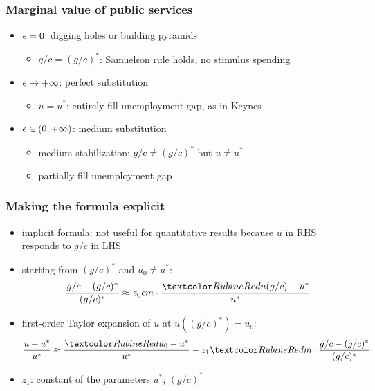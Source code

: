 \documentclass[12pt,xcolor={dvipsnames},hyperref={pdftex,pdfpagemode=UseNone,hidelinks,pdfdisplaydoctitle=true},usepdftitle=false]{beamer}
\begin{document}
\begin{frame}
\frametitle{Marginal value of public services}
\begin{itemize}
\item $\epsilon=0$: digging holes or building pyramids
\begin{itemize}
\item $g/c=(g/c)^{*}$: Samuelson rule holds, no stimulus spending
\end{itemize}
\item $\epsilon\to +\infty$: perfect substitution
\begin{itemize}
\item $u=u^{*}$: entirely fill unemployment gap, as in Keynes
\end{itemize}
\item $\epsilon\in (0,+\infty)$: medium substitution
\begin{itemize}
\item medium stabilization: $g/c\neq (g/c)^{*}$ but $u\neq u^{*}$
\item[\then] partially fill unemployment gap
\end{itemize}
\end{itemize}
\end{frame}

\begin{frame}
\frametitle{Making the formula explicit}
\begin{itemize}
\item implicit formula: not useful for quantitative results because $u$ in RHS responds to $g/c$ in LHS
\item starting from $(g/c)^{*}$ and $u_{0}\neq u^{*}$:
\begin{equation*}
\frac{g/c-(g/c)^{*}}{(g/c)^{*}}\approx z_0 \e m\cdot \frac{\al{u(g/c)}-u^{*}}{u^{*}}
\end{equation*}
\item first-order Taylor expansion of $u$ at $u((g/c)^{*})=u_{0}$:
\begin{equation*}
\frac{u-u^{*}}{u^{*}}\approx \frac{\al{u_{0}}-u^{*}}{u^{*}}-z_1 \al{m} \cdot\frac{g/c-(g/c)^{*}}{(g/c)^{*}}
\end{equation*}
\item $z_1$: constant of the parameters $u^*$, $(g/c)^*$
\end{itemize}
\end{frame}
\end{document}
